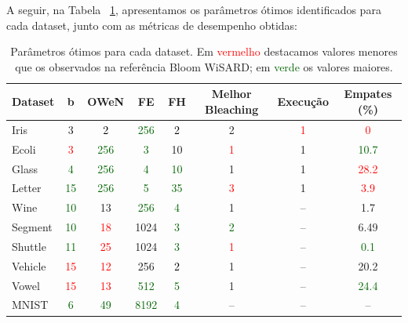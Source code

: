 \documentclass{article}
\begin{document}
A seguir, na Tabela ~\ref{tab:Opt-params}, apresentamos os parâmetros ótimos identificados para cada dataset, junto com as métricas de desempenho obtidas:

{\small
\begin{table}[H]
\caption{Parâmetros ótimos para cada dataset. Em \textcolor{red}{vermelho} destacamos valores menores que os observados na referência Bloom WiSARD; em \textcolor{darkgreen}{verde} os valores maiores.}
\label{tab:Opt-params}
\renewcommand{\arraystretch}{1.1}
\begin{center}
\begin{tabular}{lccccccc}
\hline
\textbf{Dataset} & \textbf{b} & \textbf{OWeN} & \textbf{FE} & \textbf{FH} & \textbf{Melhor Bleaching} & \textbf{Execução} & \textbf{Empates (\%)} \\
\hline
Iris & 3 & \textcolor{black}{2} & \textcolor{darkgreen}{256} & \textcolor{black}{2} & 2 & \textcolor{red}{1} & \textcolor{red}{0} \\
Ecoli & \textcolor{red}{3} & \textcolor{darkgreen}{256} & \textcolor{darkgreen}{3} & 10 & \textcolor{red}{1} & 1 & \textcolor{darkgreen}{10.7} \\
Glass & \textcolor{darkgreen}{4} & \textcolor{darkgreen}{256} & \textcolor{darkgreen}{4} & \textcolor{darkgreen}{10} & 1 & 1 & \textcolor{red}{28.2} \\
Letter & \textcolor{darkgreen}{15} & \textcolor{darkgreen}{256} & \textcolor{darkgreen}{5} & \textcolor{darkgreen}{35} & \textcolor{red}{3} & 1 & \textcolor{red}{3.9} \\
Wine & \textcolor{darkgreen}{10} & 13 & \textcolor{darkgreen}{256} & \textcolor{darkgreen}{4} & 1 & -- & 1.7 \\
Segment & \textcolor{darkgreen}{10} & \textcolor{red}{18} & 1024 & \textcolor{darkgreen}{3} & \textcolor{darkgreen}{2} & -- & 6.49 \\
Shuttle & \textcolor{darkgreen}{11} & \textcolor{red}{25} & 1024 & \textcolor{darkgreen}{3} & \textcolor{red}{1} & -- & \textcolor{darkgreen}{0.1} \\
Vehicle & \textcolor{red}{15} & \textcolor{red}{12} & 256 & \textcolor{black}{2} & 1 & -- & 20.2 \\
Vowel & \textcolor{red}{15} & \textcolor{red}{13} & \textcolor{darkgreen}{512} & \textcolor{darkgreen}{5} & 1 & -- & \textcolor{darkgreen}{24.4} \\
MNIST & \textcolor{darkgreen}{6} & \textcolor{darkgreen}{49} & \textcolor{darkgreen}{8192} & \textcolor{darkgreen}{4} & -- & -- & -- \\
\hline
\end{tabular}
\end{center}
\end{table}
}
\end{document}
